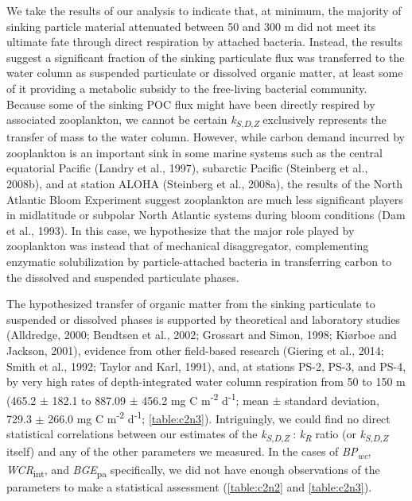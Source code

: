 We take the results of our analysis to indicate that, at minimum, the majority of sinking particle material attenuated between 50 and 300 m did not meet its ultimate fate through direct respiration by attached bacteria. Instead, the results suggest a significant fraction of the sinking particulate flux was transferred to the water column as suspended particulate or dissolved organic matter, at least some of it providing a metabolic subsidy to the free-living bacterial community. Because some of the sinking POC flux might have been directly respired by associated zooplankton, we cannot be certain \emph{k\textsubscript{S}}\textsubscript{,\emph{D},\emph{Z}} exclusively represents the transfer of mass to the water column. However, while carbon demand incurred by zooplankton is an important sink in some marine systems such as the central equatorial Pacific (Landry et al., 1997), subarctic Pacific (Steinberg et al., 2008b), and at station ALOHA (Steinberg et al., 2008a), the results of the North Atlantic Bloom Experiment suggest zooplankton are much less significant players in midlatitude or subpolar North Atlantic systems during bloom conditions (Dam et al., 1993). In this case, we hypothesize that the major role played by zooplankton was instead that of mechanical disaggregator, complementing enzymatic solubilization by particle-attached bacteria in transferring carbon to the dissolved and suspended particulate phases.

The hypothesized transfer of organic matter from the sinking particulate to suspended or dissolved phases is supported by theoretical and laboratory studies (Alldredge, 2000; Bendtsen et al., 2002; Grossart and Simon, 1998; Ki\o{}rboe and Jackson, 2001), evidence from other field-based research (Giering et al., 2014; Smith et al., 1992; Taylor and Karl, 1991), and, at stations PS-2, PS-3, and PS-4, by very high rates of depth-integrated water column respiration from 50 to 150 m (465.2 $\pm$ 182.1 to 887.09 $\pm$ 456.2 mg C m\textsuperscript{-2} d\textsuperscript{-1}; mean $\pm$ standard deviation, 729.3 $\pm$ 266.0 mg C m\textsuperscript{-2} d\textsuperscript{-1}; \autoref{table:c2n3}). Intriguingly, we could find no direct statistical correlations between our estimates of the \emph{k\textsubscript{S}}\textsubscript{,\emph{D},\emph{Z}} : \emph{k\textsubscript{R}} ratio (or \emph{k\textsubscript{S}}\textsubscript{,\emph{D},\emph{Z}} itself) and any of the other parameters we measured. In the cases of \emph{BP\textsubscript{wc}}, \emph{WCR}\textsubscript{int}, and \emph{BGE}\textsubscript{pa} specifically, we did not have enough observations of the parameters to make a statistical assessment (\autoref{table:c2n2} and \autoref{table:c2n3}).

